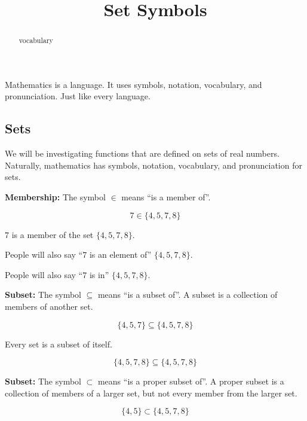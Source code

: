 \documentclass{ximera}
\title{Set Symbols}
\begin{document}
\begin{abstract}
vocabulary
\end{abstract}
\maketitle




Mathematics is a language.  It uses symbols, notation, vocabulary, and pronunciation. Just like every language.   




\subsection*{Sets}



We will be investigating functions that are defined on sets of real numbers. Naturally, mathematics has symbols, notation, vocabulary, and pronunciation for sets. 



\textbf{\textcolor{blue!55!black}{Membership:}}  The symbol $\in$ means ``is a member of''.


\[
7 \in \{ 4, 5, 7, 8 \}
\]

\begin{center}

$7$ is a member of the set $\{ 4, 5, 7, 8 \}$.

\end{center}

People will also say ``$7$ is an element of'' $\{ 4, 5, 7, 8 \}$. 

People will also say ``$7$ is in'' $\{ 4, 5, 7, 8 \}$. 



\textbf{\textcolor{blue!55!black}{Subset:}}  The symbol $\subseteq$ means ``is a subset of''.  A subset is a collection of members of another set.


\[
\{ 4, 5, 7 \} \subseteq \{ 4, 5, 7, 8 \}
\]


Every set is a subset of itself.


\[
\{ 4, 5, 7, 8 \} \subseteq \{ 4, 5, 7, 8 \}
\]





\textbf{\textcolor{blue!55!black}{Subset:}}  The symbol $\subset$ means ``is a proper subset of''. A proper subset is a collection of members of a larger set, but not every member from the larger set.


\[
\{ 4, 5 \} \subset \{ 4, 5, 7, 8 \}
\]
\end{document}
